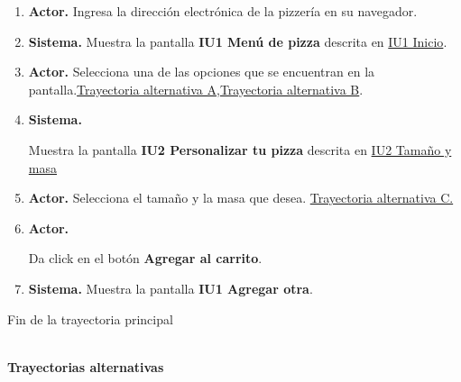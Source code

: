 		\begin{enumerate}
			\item {\textbf{Actor.}} Ingresa la dirección electrónica de la pizzería en su navegador.
			
			\item \textbf{Sistema.} Muestra la pantalla \textbf{IU1 Menú de pizza} descrita en \hyperlink{IU1}{IU1 Inicio}.
			
			\item \textbf{Actor.} Selecciona una de las opciones que se encuentran en la pantalla.\hyperlink{CU1:TAA}{Trayectoria alternativa A},\hyperlink{CU1:TAB}{Trayectoria alternativa B}. 
			
			\item \hypertarget{CU1:TP:P4}{\textbf{Sistema.}} Muestra la pantalla  \textbf{IU2 Personalizar tu pizza} descrita en \hyperlink{IU2}{IU2 Tamaño y masa}
			
			\item \textbf{Actor.} Selecciona el tamaño y la masa que desea. \hyperlink{CU1:TAC}{Trayectoria alternativa C.}
			
			\item  \hypertarget{CU1:TP:P6}{\textbf{Actor.}} Da click en el botón \textbf{Agregar al carrito}.
			
			\item \textbf{Sistema.} Muestra la pantalla \textbf{IU1 Agregar otra}.
			
			
		\end{enumerate}	
		Fin de la trayectoria principal

	\noindent \textbf{\\Trayectorias alternativas}

